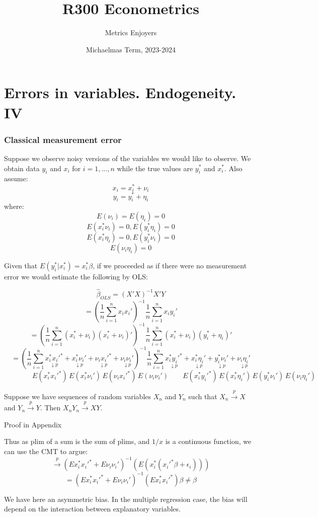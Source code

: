 \documentclass[DIV=14,titlepage=false]{scrreprt}
\title{%
R300 Econometrics}
\author{Metrics Enjoyers}
\date{Michaelmas Term, 2023-2024}
\begin{document}
\chapter{Errors in variables. Endogeneity. IV}

\subsection{Classical measurement error}
Suppose we observe noisy versions of the variables we would like to observe.
We obtain data \(y_i\) and \(x_i\) for \(i=1,...,n\) while the true values are \(y_i^*\) and \(x_i^*\).
Also assume:
\[x_i=x_i^*+\nu_i\]
\[y_i=y_i^*+\eta_i\]
where:
\[E(\nu_i)=E(\eta_i)=0\]
\[E(x_i^*\nu_i)=0, E(y_i^*\eta_i)=0\]
\[E(x_i^*\eta_i)=0, E(y_i^*\nu_i)=0\]
\[E(\nu_i\eta_i)=0\]

Given that \(E(y_i^*|x_i^*)=x_i^*\beta\), if we proceeded as if there were no measurement error we would estimate the following by OLS:

\[\hat\beta_{OLS}=(X'X)^{-1}X'Y\]
\[=(\frac{1}{n}\sum_{i=1}^nx_ix_i')^{-1}\frac{1}{n}\sum_{i=1}^nx_iy_i'\]
\[=(\frac{1}{n}\sum_{i=1}^n(x_i^*+\nu_i)(x_i^*+\nu_i)')^{-1}\frac{1}{n}\sum_{i=1}^n(x_i^*+\nu_i)(y_i^*+\eta_i)'\]
\[
=\left(\frac{1}{n}\sum_{i=1}^n \underset{\downarrow p}{x_i^*x_i'^{*}} + \underset{\downarrow p}{x_i^*\nu_i'} + \underset{\downarrow p}{\nu_ix_i'^{*}} + \underset{\downarrow p}{\nu_i\nu_i'}\right)^{-1} \frac{1}{n}\sum_{i=1}^n \underset{\downarrow p}{x_i^*y_i'^*} + \underset{\downarrow p}{x_i^*\eta_i'} + \underset{\downarrow p}{y_i^*\nu_i'} + \underset{\downarrow p}{\nu_i\eta_i'}
\]
\[\qquad \qquad E(x_i^*x_i'^*)\, E(x_i^*\nu_i')\, E(\nu_ix_i'^*)\, E(\nu_i\nu_i') \quad \quad E(x_i^*y_i'^*)\,E(x_i^*\eta_i')\, E(y_i^*\nu_i')\, E(\nu_i\eta_i')\]

\begin{lemma}
    Suppose we have sequences of random variables \(X_n\) and \(Y_n\) such that \(X_n\overset{p}{\to}X\) and \(Y_n\overset{p}{\to}Y\). Then \(X_nY_n\overset{p}{\to}XY\).

    Proof in Appendix
\end{lemma}
\vspace{5mm}
Thus as plim of a sum is the sum of plims, and \(1/x\) is a continuous function, we can use the CMT to argue:
\[\xrightarrow{p} (Ex_i^*x_i'^*+E\nu_i\nu_i')^{-1}(E(x_i^*(x_i'^*\beta+\epsilon_i)))\]
\[=(Ex_i^*x_i'^*+E\nu_i\nu_i')^{-1}(Ex_i^*x_i'^*)\beta\neq\beta\]

We have here an asymmetric bias. In the multiple regression case, the bias will depend on the interaction between explanatory variables.
\end{document}
